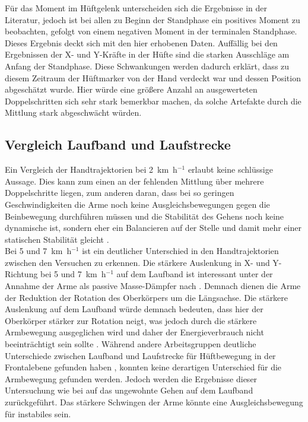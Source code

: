 Für das Moment im Hüftgelenk unterscheiden sich die Ergebnisse in der Literatur, jedoch ist bei allen zu Beginn der Standphase ein positives Moment zu beobachten, gefolgt von einem negativen Moment in der terminalen Standphase. Dieses Ergebnis deckt sich mit den hier erhobenen Daten. Auffällig bei den Ergebnissen der X- und Y-Kräfte in der Hüfte sind die starken Ausschläge am Anfang der Standphase. Diese Schwankungen werden dadurch erklärt, dass zu diesem Zeitraum der Hüftmarker von der Hand verdeckt war und dessen Position abgeschätzt wurde. Hier würde eine größere Anzahl an ausgewerteten Doppelschritten sich sehr stark bemerkbar machen, da solche Artefakte durch die Mittlung stark abgeschwächt würden.


\subsection{Vergleich Laufband und Laufstrecke}
Ein Vergleich der Handtrajektorien bei 2~km~h$^{-1}$ erlaubt keine schlüssige Aussage. Dies kann zum einen an der fehlenden Mittlung über mehrere Doppelschritte liegen, zum anderen daran, dass bei so geringen Geschwindigkeiten die Arme noch keine Ausgleichsbewegungen gegen die Beinbewegung durchführen müssen und die Stabilität des Gehens noch keine dynamische ist, sondern eher ein Balancieren auf der Stelle und damit mehr einer statischen Stabilität gleicht \parencite{barbareschi2015statically}.\\
Bei 5 und 7~km~h$^{-1}$ ist ein deutlicher Unterschied in den Handtrajektorien zwischen den Versuchen zu erkennen. Die stärkere Auslenkung in X- und Y-Richtung bei 5 und 7~km~h$^{-1}$ auf dem Laufband ist interessant unter der Annahme der Arme als passive Masse-Dämpfer nach \textcite{pontzer2009control}. Demnach dienen die Arme der Reduktion der Rotation des Oberkörpers um die Längsachse. Die stärkere Auslenkung auf dem Laufband würde demnach bedeuten, dass hier der Oberkörper stärker zur Rotation neigt, was jedoch durch die stärkere Armbewegung ausgeglichen wird und daher der Energieverbrauch nicht beeinträchtigt sein sollte \parencite{pontzer2009control}. Während andere Arbeitsgruppen deutliche Unterschiede zwischen Laufband und Laufstrecke für Hüftbewegung in der Frontalebene gefunden haben \parencite{alton1998kinematic}, konnten keine derartigen Unterschied für die Armbewegung gefunden werden. Jedoch werden die Ergebnisse dieser Untersuchung wie bei \textcite{alton1998kinematic} auf das ungewohnte Gehen auf dem Laufband zurückgeführt. Das stärkere Schwingen der Arme könnte eine Ausgleichsbewegung für instabiles sein.\\
